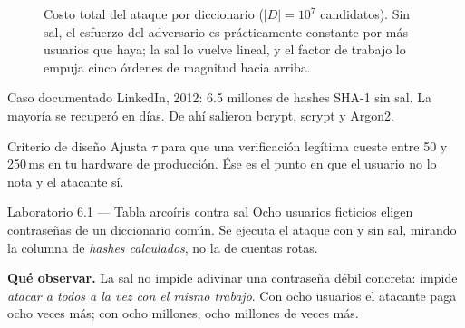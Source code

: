 \documentclass[11pt,a4paper]{article}
\theoremstyle{definition}
\theoremstyle{plain}
\theoremstyle{remark}
\begin{document}
\begin{figure}[htbp]
\centering
{}
\caption{Costo total del ataque por diccionario ($|D| = 10^{7}$ candidatos). Sin
sal, el esfuerzo del adversario es prácticamente constante por más usuarios que
haya; la sal lo vuelve lineal, y el factor de trabajo lo empuja cinco órdenes de
magnitud hacia arriba.}
\label{fig:contrasenas}
\end{figure}

\begin{caso}{Caso documentado}
LinkedIn, 2012: 6.5 millones de hashes SHA-1 sin sal. La mayoría se recuperó en
días. De ahí salieron bcrypt, scrypt y Argon2.
\end{caso}

\begin{nota}{Criterio de diseño}
Ajusta $\tau$ para que una verificación legítima cueste entre 50 y 250\,ms en tu
hardware de producción. Ése es el punto en que el usuario no lo nota y el
atacante sí.
\end{nota}

\begin{laboratorio}{Laboratorio 6.1 — Tabla arcoíris contra sal}
Ocho usuarios ficticios eligen contraseñas de un diccionario común. Se ejecuta el
ataque con y sin sal, mirando la columna de \emph{hashes calculados}, no la de
cuentas rotas.

\textbf{Qué observar.} La sal no impide adivinar una contraseña débil concreta:
impide \emph{atacar a todos a la vez con el mismo trabajo}. Con ocho usuarios el
atacante paga ocho veces más; con ocho millones, ocho millones de veces más.
\end{laboratorio}
\end{document}
